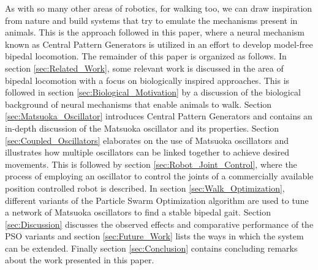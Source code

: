 \documentclass[12pt,twoside]{article}
\theoremstyle{plain}
\theoremstyle{definition}
\theoremstyle{remark}
\newcommand{\forceindent}{\leavevmode{\parindent=2em\indent}}
\begin{document}
\forceindent As with so many other areas of robotics, for walking too, we can draw inspiration from nature and build systems that try to emulate the mechanisms present in animals. This is the approach followed in this paper, where a neural mechanism known as Central Pattern Generators is utilized in an effort to develop model-free bipedal locomotion. The remainder of this paper is organized as follows. In section \ref{sec:Related_Work}, some relevant work is discussed in the area of bipedal locomotion with a focus on biologically inspired approaches. This is followed in section \ref{sec:Biological_Motivation} by a discussion of the biological background of neural mechanisms that enable animals to walk. Section \ref{sec:Matsuoka_Oscillator} introduces Central Pattern Generators and contains an in-depth discussion of the Matsuoka oscillator and its properties. Section \ref{sec:Coupled_Oscillators} elaborates on the use of Matsuoka oscillators and illustrates how multiple oscillators can be linked together to achieve desired movements. This is followed by section \ref{sec:Robot_Joint_Control}, where the process of employing an oscillator to control the joints of a commercially available position controlled robot is described. In section \ref{sec:Walk_Optimization}, different variants of the Particle Swarm Optimization algorithm are used to tune a network of Matsuoka oscillators to find a stable bipedal gait. Section \ref{sec:Discussion} discusses the observed effects and comparative performance of the PSO variants and section \ref{sec:Future_Work} lists the ways in which the system can be extended. Finally section \ref{sec:Conclusion} contains concluding remarks about the work presented in this paper.
\end{document}
